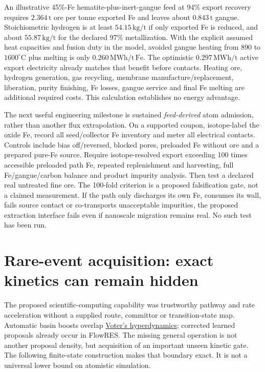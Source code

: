 \documentclass[11pt]{article}
\begin{document}
An illustrative 45\%-Fe hematite-plus-inert-gangue feed at 94\% export recovery
requires $2.364\,\mathrm t$ ore per tonne exported Fe and leaves about
$0.843\,\mathrm t$ gangue. Stoichiometric hydrogen is at least
$54.15\,\mathrm{kg/t}$ if only exported Fe is reduced, and about
$55.87\,\mathrm{kg/t}$ for the declared 97\% metallization.
With the explicit assumed heat capacities and fusion duty in the model,
avoided gangue heating from 890 to $1600^\circ\mathrm C$ plus melting is only
$0.260\,\mathrm{MWh/t\,Fe}$. The optimistic $0.297\,\mathrm{MWh/t}$ active
export electricity already matches that benefit before contacts. Heating ore,
hydrogen generation, gas recycling, membrane manufacture/replacement,
liberation, purity finishing, Fe losses, gangue service and final Fe melting
are additional required costs. This calculation establishes no energy advantage.

The next useful engineering milestone is sustained \emph{feed-derived} atom
admission, rather than another flux extrapolation. On a supported coupon,
isotope-label the oxide Fe, record all seed/collector Fe inventory and meter
all electrical contacts. Controls include bias off/reversed, blocked pores,
preloaded Fe without ore and a prepared pure-Fe source. Require isotope-resolved
export exceeding 100 times accessible preloaded path Fe, repeated replenishment
and harvesting, full Fe/gangue/carbon balance and product impurity analysis.
Then test a declared real untreated fine ore. The 100-fold criterion is a
proposed falsification gate, not a claimed measurement.
If the path only discharges its own Fe, consumes its wall, fails source contact
or co-transports unacceptable impurities, the proposed extraction interface
fails even if nanoscale migration remains real. No such test has been run.

\section{Rare-event acquisition: exact kinetics can remain hidden}

The proposed scientific-computing capability was trustworthy pathway and rate
acceleration without a supplied route, committor or transition-state map.
Automatic basin boosts overlap
\href{https://doi.org/10.1103/PhysRevLett.78.3908}{Voter's hyperdynamics};
corrected learned proposals already occur in FlowRES. The missing general
operation is not another proposal density, but acquisition of an important
unseen kinetic gate. The following finite-state construction makes that boundary
exact. It is not a universal lower bound on atomistic simulation.
\end{document}
